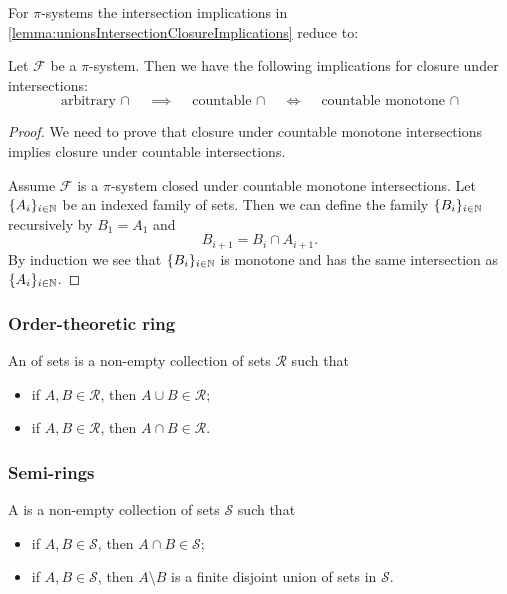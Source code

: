 For $\pi$-systems the intersection implications in \ref{lemma:unionsIntersectionClosureImplications} reduce to:
\begin{lemma} \label{lemma:unionsIntersectionClosureImplications}
Let $\mathcal{F}$ be a $\pi$-system. Then we have the following implications for closure under intersections:
\[ \text{arbitrary $\cap$} \quad\implies\quad \text{countable $\cap$} \quad\iff\quad \text{countable monotone $\cap$} \]
\end{lemma}
\begin{proof}
We need to prove that closure under countable monotone intersections implies closure under countable intersections.

Assume $\mathcal{F}$ is a $\pi$-system closed under countable monotone intersections. Let $\{A_i\}_{i\in \mathbb{N}}$ be an indexed family of sets. Then we can define the family $\{B_i\}_{i\in \mathbb{N}}$ recursively by $B_1 = A_1$ and
\[ B_{i+1} = B_i \cap A_{i+1}. \]
By induction we see that $\{B_i\}_{i\in \mathbb{N}}$ is monotone and has the same intersection as $\{A_i\}_{i\in \mathbb{N}}$.
\end{proof}

\subsubsection{Order-theoretic ring}
\begin{definition}
An  of sets is a non-empty collection of sets $\mathcal{R}$ such that
\begin{itemize}
\item if $A,B\in \mathcal{R}$, then $A\cup B\in \mathcal{R}$;
\item if $A,B\in \mathcal{R}$, then $A\cap B\in \mathcal{R}$.
\end{itemize}
\end{definition}

\subsubsection{Semi-rings}
\begin{definition}
A  is a non-empty collection of sets $\mathcal{S}$ such that
\begin{itemize}
\item if $A,B\in \mathcal{S}$, then $A\cap B\in \mathcal{S}$;
\item if $A,B\in \mathcal{S}$, then $A\setminus B$ is a finite disjoint union of sets in $\mathcal{S}$.
\end{itemize}
\end{definition}

